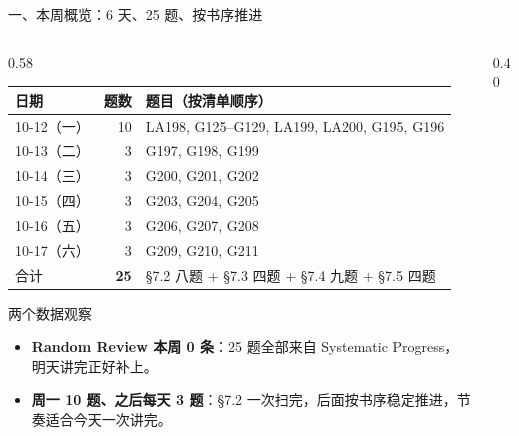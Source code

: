 \documentclass[aspectratio=169,10pt,fontset=none]{ctexbeamer}
\begin{document}
\begin{frame}[t]{一、本周概览：6 天、25 题、按书序推进}
  \begin{columns}[T,onlytextwidth]
    \begin{column}{0.58\textwidth}
      \centering
      \scriptsize
      \renewcommand{\arraystretch}{1.12}
      \begin{tabular}{@{}l r l@{}}
        \toprule
        日期 & 题数 & 题目（按清单顺序）\\
        \midrule
        10-12（一） & 10 & LA198, G125--G129, LA199, LA200, G195, G196\\
        10-13（二） & 3  & G197, G198, G199\\
        10-14（三） & 3  & G200, G201, G202\\
        10-15（四） & 3  & G203, G204, G205\\
        10-16（五） & 3  & G206, G207, G208\\
        10-17（六） & 3  & G209, G210, G211\\
        \midrule
        合计 & \textbf{25} & \S7.2 八题 + \S7.3 四题 + \S7.4 九题 + \S7.5 四题\\
        \bottomrule
      \end{tabular}
      \vspace{0.3em}

      \raggedright
      \begin{exampleblock}{\footnotesize 两个数据观察}
        \scriptsize
        \begin{itemize}\setlength{\itemsep}{1pt}
          \item \textbf{Random Review 本周 0 条}：25 题全部来自 Systematic Progress，明天讲完正好补上。
          \item \textbf{周一 10 题、之后每天 3 题}：\S7.2 一次扫完，后面按书序稳定推进，节奏适合今天一次讲完。
        \end{itemize}
      \end{exampleblock}
    \end{column}
    \begin{column}{0.40\textwidth}
      \centering


\end{column}
\end{columns}
\end{frame}
\end{document}
